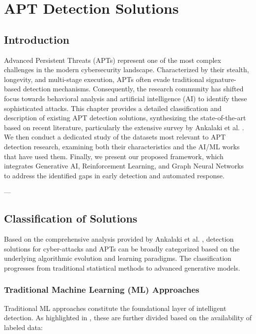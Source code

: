 \chapter{APT Detection Solutions}
\label{chap:apt\_solutions}

\section{Introduction}

Advanced Persistent Threats (APTs) represent one of the most complex challenges in the modern cybersecurity landscape. Characterized by their stealth, longevity, and multi-stage execution, APTs often evade traditional signature-based detection mechanisms. Consequently, the research community has shifted focus towards behavioral analysis and artificial intelligence (AI) to identify these sophisticated attacks. This chapter provides a detailed classification and description of existing APT detection solutions, synthesizing the state-of-the-art based on recent literature, particularly the extensive survey by Ankalaki et al. \cite{ankalaki2025cyber}. We then conduct a dedicated study of the datasets most relevant to APT detection research, examining both their characteristics and the AI/ML works that have used them. Finally, we present our proposed framework, which integrates Generative AI, Reinforcement Learning, and Graph Neural Networks to address the identified gaps in early detection and automated response.

---

\section{Classification of Solutions}

Based on the comprehensive analysis provided by Ankalaki et al. \cite{ankalaki2025cyber}, detection solutions for cyber-attacks and APTs can be broadly categorized based on the underlying algorithmic evolution and learning paradigms. The classification progresses from traditional statistical methods to advanced generative models.

\subsection{Traditional Machine Learning (ML) Approaches}

Traditional ML approaches constitute the foundational layer of intelligent detection. As highlighted in \cite{ankalaki2025cyber}, these are further divided based on the availability of labeled data:

